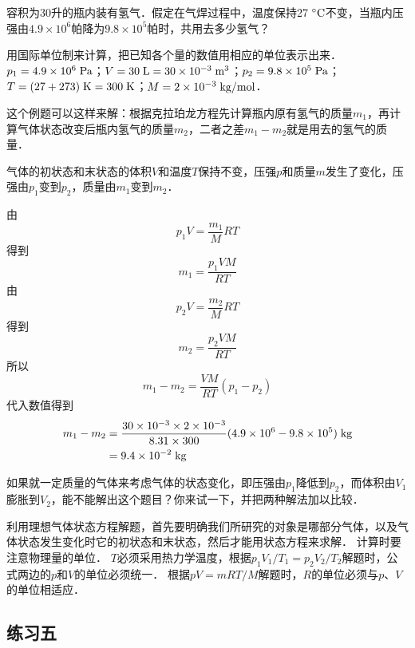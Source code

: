 \begin{example}
容积为30升的瓶内装有氢气．假定在气焊过程中，温度保持27$\;{}^\circ\text{C}$不变，当瓶内压强由$4. 9\times 10^6$帕降为$9.8\times 10^5$帕时，共用去多少氢气？
\end{example}

\begin{solution}
用国际单位制来计算，把已知各个量的数值用相应的单位表示出来．
$p_1=4.9\times 10^6 \;\text{Pa} $；$V=30\;\text{L}=30\times 10^{-3}\;\text{m}^3$；$p_2=9.8\times 10^5\;\text{Pa}$；$T=(27+273)\;\text{K}=300\;\text{K}$；$M=2\times 10^{-3} \;\text{kg}/\text{mol}$．

这个例题可以这样来解：根据克拉珀龙方程先计算瓶内原有氢气的质量$m_1$，再计算气体状态改变后瓶内氢气的质量$m_2$，二者之差$m_1-m_2$就是用去的氢气的质量．

气体的初状态和末状态的体积$V$和温度$T$保持不变，压强$p$和质量$m$发生了变化，压强由$p_1$变到$p_2$，质量由$m_1$变到$m_2$．

由
\[
p_1V=\dfrac{m_1}{M}RT
\]
得到
\[
m_1=\dfrac{p_1VM}{RT}
\]
由
\[
p_2V=\dfrac{m_2}{M}RT
\]
得到
\[
m_2=\dfrac{p_2VM}{RT}
\]
所以
\[m_1-m_2=\frac{VM}{RT}(p_1-p_2) \]
代入数值得到
\[\begin{split}
m_1-m_2&=\frac{30\times 10^{-3}\times 2\times 10^{-3}}{8.31\times 300}(4.9\times 10^6-9.8\times 10^5)\;\text{kg}\\
    &=9.4\times 10^{-2} \;\text{kg}
\end{split} \]
\end{solution}

如果就一定质量的气体来考虑气体的状态变化，即压强由$p_1$降低到$p_2$，而体积由$V_1$膨胀到$V_2$，能不能解出这个题目？你来试一下，并把两种解法加以比较．

利用理想气体状态方程解题，首先要明确我们所研究的对象是哪部分气体，以及气体状态发生变化时它的初状态和末状态，然后才能用状态方程来求解．
计算时要注意物理量的单位．
$T$必须采用热力学温度，根据$p_1V_1/T_1=p_2V_2/T_2$解题时，公式两边的$p$和$V$的单位必须统一．
根据$pV=mRT/M$解题时，$R$的单位必须与$p$、$V$的单位相适应．

\subsection*{练习五}

